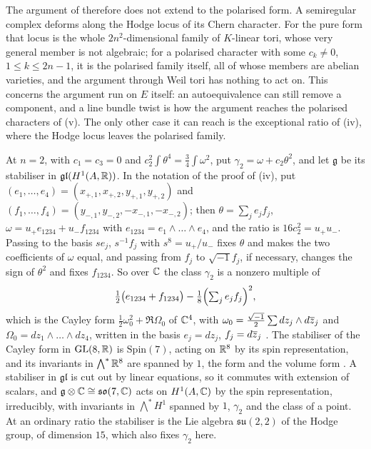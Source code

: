 The argument of  therefore does not extend to the
polarised form. A semiregular complex deforms along the Hodge locus of its
Chern character. For the pure form that locus is the whole
$2n^{2}$-dimensional family of $K$-linear tori, whose very general member is
not algebraic; for a polarised character with some $c_{k}\ne0$,
$1\le k\le2n-1$, it is the polarised family itself, all of whose members are
abelian varieties, and the argument through Weil tori has nothing to act on.
This concerns the argument run on $E$ itself: an autoequivalence can still
remove a component, and a line bundle twist is how the argument reaches the
polarised characters of (v). The only other case it
can reach is the exceptional ratio of (iv), where the Hodge locus leaves the
polarised family.

\begin{remark}[The exceptional ratio at $n=2$]\label{rem:p2primeexceptional}
At $n=2$, with $c_{1}=c_{3}=0$ and $c_{2}^{2}\int\theta^{4}=\frac34\int\omega^{2}$,
put $\gamma_{2}=\omega+c_{2}\theta^{2}$, and let $\mathfrak{g}$ be its
stabiliser in $\mathfrak{gl}(H^{1}(A,\mathbb{R}))$. In the notation of the proof of
(iv), put $(e_{1},\dots,e_{4})=(x_{+,1},x_{+,2},
y_{+,1},y_{+,2})$ and $(f_{1},\dots,f_{4})=(y_{-,1},y_{-,2},-x_{-,1},
-x_{-,2})$; then $\theta=\sum_{j}e_{j}f_{j}$,
$\omega=u_{+}e_{1234}+u_{-}f_{1234}$ with $e_{1234}=e_{1}\wedge\dots\wedge
e_{4}$, and the ratio is $16c_{2}^{2}=u_{+}u_{-}$. Passing to the basis
$se_{j}$, $s^{-1}f_{j}$ with $s^{8}=u_{+}/u_{-}$ fixes $\theta$ and makes the
two coefficients of $\omega$ equal, and passing from $f_{j}$ to
$\sqrt{-1}f_{j}$, if necessary, changes the sign of $\theta^{2}$ and fixes
$f_{1234}$. So over
$\mathbb{C}$ the class $\gamma_{2}$ is a nonzero multiple of
\[
  \tfrac12\bigl(e_{1234}+f_{1234}\bigr)-\tfrac18\Bigl(\textstyle\sum_{j}e_{j}f_{j}\Bigr)^{2},
\]
which is the Cayley form $\frac12\omega_{0}^{2}+\Re\Omega_{0}$ of $\mathbb{C}^{4}$,
with $\omega_{0}=\frac{\sqrt{-1}}{2}\sum dz_{j}\wedge d\overline{z}_{j}$ and
$\Omega_{0}=dz_{1}\wedge\dots\wedge dz_{4}$, written in the basis
$e_{j}=dz_{j}$, $f_{j}=d\overline{z}_{j}$ \cite{HL82}. The stabiliser
of the Cayley form in $\operatorname{GL}(8,\mathbb{R})$ is $\mathrm{Spin}(7)$, acting on $\mathbb{R}^{8}$
by its spin representation, and its invariants in $\bigwedge^{*}\mathbb{R}^{8}$ are
spanned by $1$, the form and the volume form \cite{Bry87}. A stabiliser in
$\mathfrak{gl}$ is cut out by linear equations, so it commutes with
extension of scalars, and $\mathfrak{g}\otimes\mathbb{C}\cong\mathfrak{so}(7,\mathbb{C})$
acts on $H^{1}(A,\mathbb{C})$ by the spin representation, irreducibly, with
invariants in $\bigwedge^{*}H^{1}$ spanned by $1$, $\gamma_{2}$ and the
class of a point. At an ordinary ratio the stabiliser is the Lie algebra
$\mathfrak{su}(2,2)$ of the Hodge group, of dimension $15$, which also fixes
$\gamma_{2}$ here.


\end{remark}
